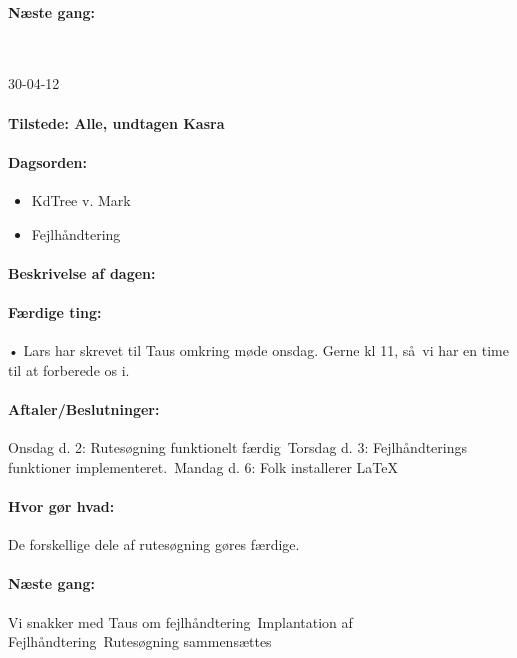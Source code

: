\documentclass[a4paper,10pt,titlepage]{article}
\begin{document}
		\paragraph{N\ae ste gang:}\mbox{}\\
		
		\begin{center}
		30-04-12
		\end{center}
		
		\paragraph{Tilstede: Alle, undtagen Kasra}
		\paragraph{Dagsorden:}
		\begin{itemize}
					\item KdTree v. Mark
					\item Fejlh\aa ndtering
		\end{itemize}
		
		\paragraph{Beskrivelse af dagen:}
		
		\paragraph{F\ae rdige ting:}
		•	Lars har skrevet til Taus omkring m\o de onsdag. Gerne kl 11, s\aa \ vi har en time til at forberede os i.
		\paragraph{Aftaler/Beslutninger:}
		Onsdag d. 2: Rutes\o gning funktionelt f\ae rdig\
Torsdag d. 3: Fejlh\aa ndterings funktioner implementeret.\
Mandag d. 6: Folk installerer LaTeX

		\paragraph{Hvor g\o r hvad:}
		De forskellige dele af rutes\o gning g\o res f\ae rdige.
		\paragraph{N\ae ste gang:}
Vi snakker med Taus om fejlh\aa ndtering\
Implantation af Fejlh\aa ndtering\
Rutes\o gning sammens\ae ttes\mbox{}\\
\end{document}
